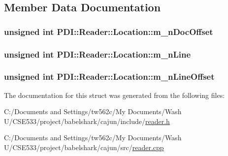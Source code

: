 \subsection{Member Data Documentation}
\hypertarget{struct_p_d_i_1_1_reader_1_1_location_5c2e66e60aa0683da75aeeccef81b549}{
\subsubsection[{m\_\-nDocOffset}]{\setlength{\rightskip}{0pt plus 5cm}unsigned int {\bf PDI::Reader::Location::m\_\-nDocOffset}}}
\label{struct_p_d_i_1_1_reader_1_1_location_5c2e66e60aa0683da75aeeccef81b549}


\hypertarget{struct_p_d_i_1_1_reader_1_1_location_1b8a831608aa150afbc0c497c889f820}{
\subsubsection[{m\_\-nLine}]{\setlength{\rightskip}{0pt plus 5cm}unsigned int {\bf PDI::Reader::Location::m\_\-nLine}}}
\label{struct_p_d_i_1_1_reader_1_1_location_1b8a831608aa150afbc0c497c889f820}


\hypertarget{struct_p_d_i_1_1_reader_1_1_location_3b4e677a48b5d935168ba35a94475e77}{
\subsubsection[{m\_\-nLineOffset}]{\setlength{\rightskip}{0pt plus 5cm}unsigned int {\bf PDI::Reader::Location::m\_\-nLineOffset}}}
\label{struct_p_d_i_1_1_reader_1_1_location_3b4e677a48b5d935168ba35a94475e77}




The documentation for this struct was generated from the following files:\begin{CompactItemize}
\item 
C:/Documents and Settings/tw562c/My Documents/Wash U/CSE533/project/babelshark/cajun/include/\hyperlink{reader_8h}{reader.h}\item 
C:/Documents and Settings/tw562c/My Documents/Wash U/CSE533/project/babelshark/cajun/src/\hyperlink{reader_8cpp}{reader.cpp}\end{CompactItemize}
